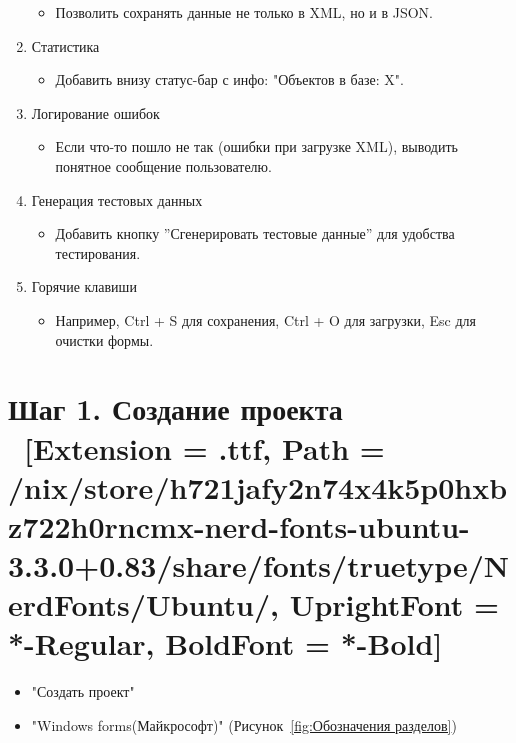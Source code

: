 \documentclass[12pt]{article}
\newcommand{\icon}[1]{\fontspec{UbuntuNerdFont}[Extension = .ttf,
  Path = /nix/store/h721jafy2n74x4k5p0hxbz722h0rncmx-nerd-fonts-ubuntu-3.3.0+0.83/share/fonts/truetype/NerdFonts/Ubuntu/,
  UprightFont = *-Regular,
BoldFont = *-Bold] #1}
\newcommand{\iicon}[1]{{\icon{#1}}}
\numberwithin{listing}{section}
\numberwithin{figure}{section}
\begin{document}
\begin{center}
\begin{minipage}{0.8\linewidth}
\begin{enumerate}[noitemsep,topsep=0pt, left=0pt]
			      \begin{itemize}
				      \item Позволить сохранять данные не только в XML, но и в JSON.
			      \end{itemize}
			\item[\iicon{}] Статистика
			      \begin{itemize}
				      \item Добавить внизу статус-бар с инфо: "Объектов в базе: X".
			      \end{itemize}
			\item[\iicon{}] Логирование ошибок
			      \begin{itemize}
				      \item Если что-то пошло не так (ошибки при загрузке XML), выводить понятное сообщение пользователю.
			      \end{itemize}
			\item[\iicon{󰙨}] Генерация тестовых данных
			      \begin{itemize}
				      \item Добавить кнопку ''Сгенерировать тестовые данные'' для удобства тестирования.
			      \end{itemize}
			\item[\iicon{}] Горячие клавиши
			      \begin{itemize}
				      \item Например, Ctrl + S для сохранения, Ctrl + O для загрузки, Esc для очистки формы.
			      \end{itemize}
		\end{enumerate}
	\end{minipage}
\end{center}

\newpage

\section{Шаг 1. Создание проекта \ \texorpdfstring{{\small{\iicon{󰙴}}}}{}}
\begin{itemize}
	\item "Создать проект"
	\item "Windows forms(Майкрософт)" (Рисунок~\ref{fig:Обозначения разделов})
\end{itemize}
\end{document}
